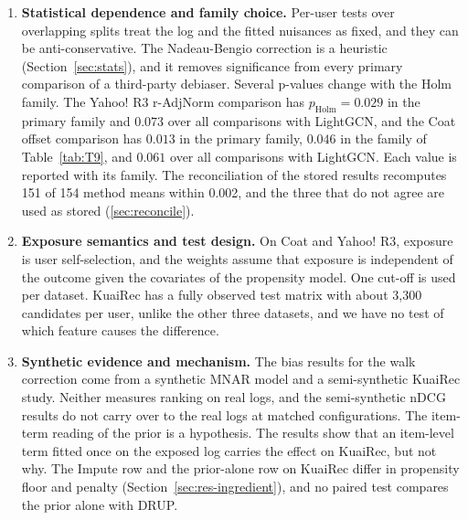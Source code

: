 \begin{enumerate}
was not run, and on KuaiRec only the additive prior was run in the offset-only LightGCN setting.
\item \textbf{Statistical dependence and family choice.} Per-user tests over overlapping splits treat the log and the
fitted nuisances as fixed, and they can be anti-conservative. The Nadeau-Bengio correction is a heuristic
(Section~\ref{sec:stats}), and it removes significance from every primary comparison of a third-party debiaser. Several
p-values change with the Holm family. The Yahoo! R3 r-AdjNorm comparison has $p_\mathrm{Holm}=0.029$ in the primary family
and $0.073$ over all comparisons with LightGCN, and the Coat offset comparison has $0.013$ in the primary family, $0.046$
in the family of Table~\ref{tab:T9}, and $0.061$ over all comparisons with LightGCN. Each value is reported with its
family. The reconciliation of the stored results recomputes 151 of 154 method means within 0.002, and the three that
do not agree are used as stored (\ref{sec:reconcile}).
\item \textbf{Exposure semantics and test design.} On Coat and Yahoo! R3, exposure is user self-selection, and the
weights assume that exposure is independent of the outcome given the covariates of the propensity model. One cut-off
is used per dataset. KuaiRec has a fully observed test matrix with about 3,300 candidates per user, unlike the other
three datasets, and we have no test of which feature causes the difference.
\item \textbf{Synthetic evidence and mechanism.} The bias results for the walk correction come from a synthetic MNAR
model and a semi-synthetic KuaiRec study. Neither measures ranking on real logs, and the semi-synthetic nDCG results do
not carry over to the real logs at matched configurations. The item-term reading of the prior is a hypothesis. The
results show that an item-level term fitted once on the exposed log carries the effect on KuaiRec, but not why. The
Impute row and the prior-alone row on KuaiRec differ in propensity floor and penalty (Section~\ref{sec:res-ingredient}),
and no paired test compares the prior alone with DRUP.
\end{enumerate}
